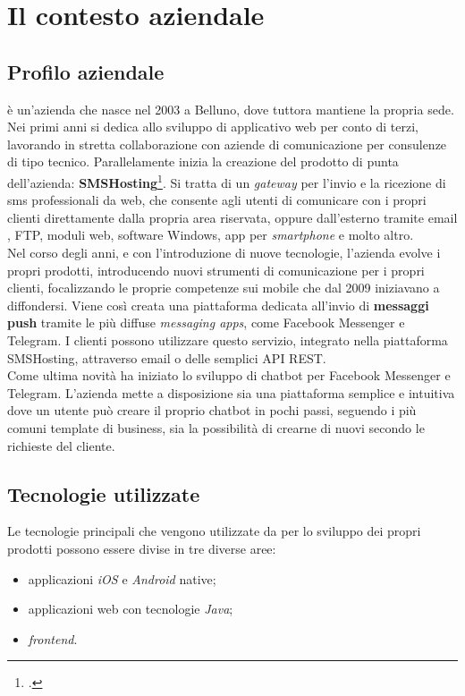 
\chapter{Il contesto aziendale}
\label{cap:contesto-aziendale}

\section{Profilo aziendale}
\azienda{} è un'azienda che nasce nel 2003 a Belluno, dove tuttora mantiene la propria sede. Nei primi anni si dedica allo sviluppo di applicativo web per conto di terzi, lavorando in stretta collaborazione con aziende di comunicazione per consulenze di tipo tecnico. Parallelamente inizia la creazione del prodotto di punta dell'azienda: \textbf{SMSHosting}\footcite{smshosting}. Si tratta di un \emph{gateway} per l'invio e la ricezione di sms professionali da web, che consente agli utenti di comunicare con i propri clienti direttamente dalla propria area riservata, oppure dall'esterno tramite email , \gls{FTP}, moduli web, software Windows, app per \emph{smartphone} e molto altro.  \\
Nel corso degli anni, e con l'introduzione di nuove tecnologie, l'azienda evolve i propri prodotti, introducendo nuovi strumenti di comunicazione per i propri clienti, focalizzando le proprie competenze sui mobile che dal 2009 iniziavano a diffondersi.
Viene così creata una piattaforma dedicata all'invio di \textbf{messaggi \gls{push}} tramite le più diffuse \emph{messaging apps}, come Facebook Messenger e Telegram. I clienti possono utilizzare questo servizio, integrato nella piattaforma SMSHosting, attraverso email o delle semplici \gls{API} REST.\\
Come ultima novità \azienda{} ha iniziato lo sviluppo di \gls{chatbot} per Facebook Messenger e Telegram. L'azienda mette a disposizione sia una piattaforma semplice e intuitiva dove un utente può creare il proprio \gls{chatbot} in pochi passi, seguendo i più comuni template di business, sia la possibilità di crearne di nuovi secondo le richieste del cliente.

\section{Tecnologie utilizzate}
Le tecnologie principali che vengono utilizzate da \azienda{} per lo sviluppo dei propri prodotti possono essere divise in tre diverse aree:
\begin{itemize}
	\item applicazioni \emph{iOS} e \emph{Android} native;
	\item applicazioni web con tecnologie \emph{Java};
	\item \emph{frontend}.
\end{itemize} 


